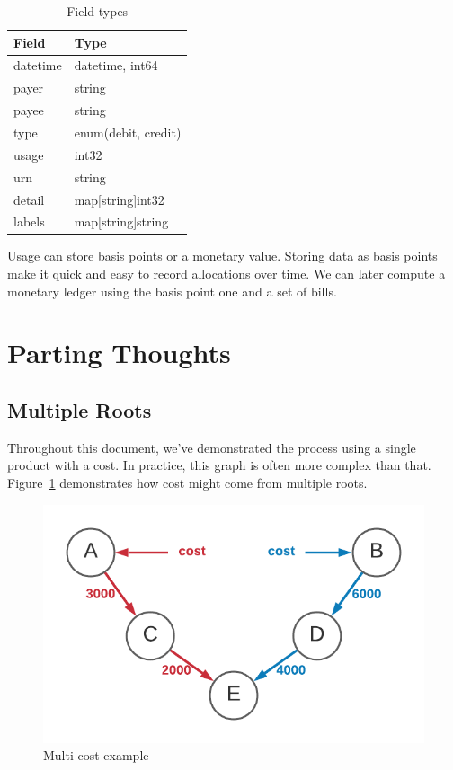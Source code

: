 \documentclass[10pt, a4paper, twocolumn]{article}
\begin{document}
    \begin{table}[H]
      \centering
      \begin{tabular}{ l|l }
        Field & Type \\
        \hline
        datetime & datetime, int64 \\
        payer & string \\
        payee & string \\
        type & enum(debit, credit) \\
        usage & int32 \\
        urn & string \\
        detail & map[string]int32 \\
        labels & map[string]string \\
      \end{tabular}
      \caption{Field types}
      \label{table:4}
    \end{table}

    Usage can store basis points or a monetary value.
    Storing data as basis points make it quick and easy to record allocations over time.
    We can later compute a monetary ledger using the basis point one and a set of bills.

\section*{Parting Thoughts}

  \subsection*{Multiple Roots}
    Throughout this document, we've demonstrated the process using a single product with a cost.
    In practice, this graph is often more complex than that.
    Figure~\ref{figure:8} demonstrates how cost might come from multiple roots.

    \begin{figure}[H]
      \centering
      \includegraphics[width=\linewidth]{./cost-attribution-cost-multiple.png}
      \caption{Multi-cost example}
      \label{figure:8}
    \end{figure}
\end{document}
